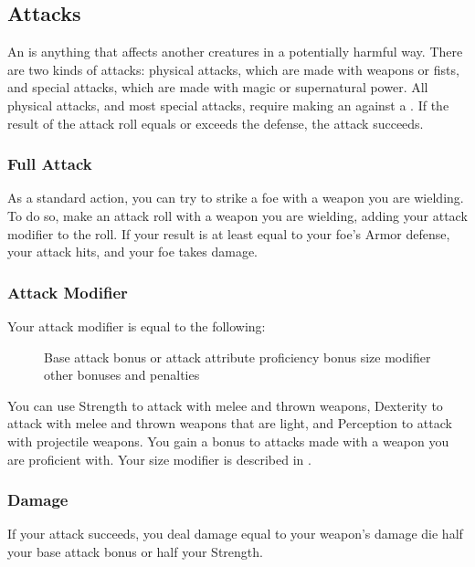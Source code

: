 \subsection{Attacks}\label{Attacks}
An  is anything that affects another creatures in a potentially harmful way.
There are two kinds of attacks: physical attacks, which are made with weapons or fists, and special attacks, which are made with magic or supernatural power.
All physical attacks, and most special attacks, require making an  against a .
If the result of the attack roll equals or exceeds the defense, the attack succeeds.

\subsubsection{Full Attack}\label{Full Attack}
As a standard action, you can try to strike a foe with a weapon you are wielding.
To do so, make an attack roll with a weapon you are wielding, adding your attack modifier to the roll.
If your result is at least equal to your foe's Armor defense, your attack hits, and your foe takes damage.

\subsubsection{Attack Modifier}
Your attack modifier is equal to the following:

\begin{figure}[h]
    \centering Base attack bonus or attack attribute \add proficiency bonus  \add size modifier \add other bonuses and penalties
\end{figure}

 You can use Strength to attack with melee and thrown weapons, Dexterity to attack with melee and thrown weapons that are light, and Perception to attack with projectile weapons.
 You gain a  bonus to attacks made with a weapon you are proficient with.
 Your size modifier is described in .

\subsubsection{Damage}
If your attack succeeds, you deal damage equal to your weapon's damage die \add half your base attack bonus or half your Strength.

